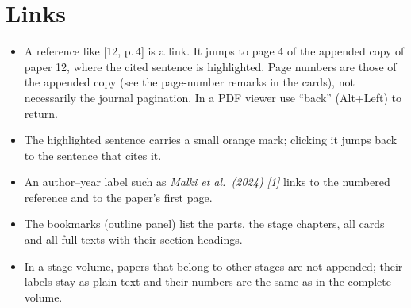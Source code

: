 \section*{Links}
\begin{itemize}
\item A reference like \textcolor{LinkBlue}{[12, p.\,4]} is a link. It jumps to page 4 of the appended copy of paper 12, where the cited sentence is highlighted. Page numbers are those of the appended copy (see the page-number remarks in the cards), not necessarily the journal pagination. In a PDF viewer use ``back'' (Alt+Left) to return.
\item The highlighted sentence carries a small orange mark; clicking it jumps back to the sentence that cites it.
\item An author--year label such as \emph{Malki et al.\ (2024) [1]} links to the numbered reference and to the paper's first page.
\item The bookmarks (outline panel) list the parts, the stage chapters, all cards and all full texts with their section headings.
\item In a stage volume, papers that belong to other stages are not appended; their labels stay as plain text and their numbers are the same as in the complete volume.
\end{itemize}

